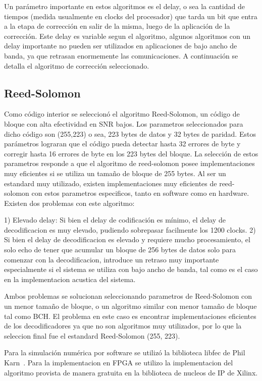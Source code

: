 Un parámetro importante en estos algoritmos es el delay, o sea la cantidad de tiempos (medida usualmente en clocks del procesador) que tarda un bit que entra a la etapa de corrección en salir de la misma, luego de la aplicación de la corrección. Este delay es variable segun el algoritmo, algunos algoritmos con un delay importante no pueden ser utilizados en aplicaciones de bajo ancho de banda, ya que retrasan enormemente las comunicaciones. A continuación se detalla el algoritmo de corrección seleccionado.

\subsection{Reed-Solomon}
Como código interior se seleccionó el algoritmo Reed-Solomon, un código de bloque con alta efectividad en SNR bajos. Los parametros seleccionados para dicho código son (255,223) o sea, 223 bytes de datos y 32 bytes de paridad. Estos parámetros lograran que el código pueda detectar hasta 32 errores de byte y corregir hasta 16 errores de byte en los 223 bytes del bloque. La selección de estos parametros responde a que el algoritmo de reed-solomon posee implementaciones muy eficientes si se utiliza un tamaño de bloque de 255 bytes. 
Al ser un estandard muy utilizado, existen implementaciones muy eficientes de reed-solomon con estos parametros especificos, tanto en software como en hardware.
Existen dos problemas con este algoritmo:

1) Elevado delay: Si bien el delay de codificación es mínimo, el delay de decodificacion es muy elevado, pudiendo sobrepasar facilmente los 1200 clocks.
2) Si bien el delay de decodificacion es elevado y requiere mucho procesamiento, el solo echo de tener que acumular un bloque de 256 bytes de datos solo para comenzar con la decodificacion, introduce un retraso muy importante especialmente si el sistema se utiliza con bajo ancho de banda, tal como es el caso en la implementacion acustica del sistema.

Ambos problemas se solucionan seleccionando parametros de Reed-Solomon con un menor tamaño de bloque, o un algoritmo similar con menor tamaño de bloque tal como BCH. El problema en este caso es encontrar implementaciones eficientes de los decodificadores ya que no son algoritmos muy utilizados, por lo que la seleccion final fue el estandard Reed-Solomon (255, 223).

Para la simulación numérica por software se utilizó la biblioteca libfec de Phil Karn~\cite{libfec}. Para la implementacion en FPGA se utilizo la implementacion del algoritmo provista de manera gratuita en la biblioteca de nucleos de IP de Xilinx.

